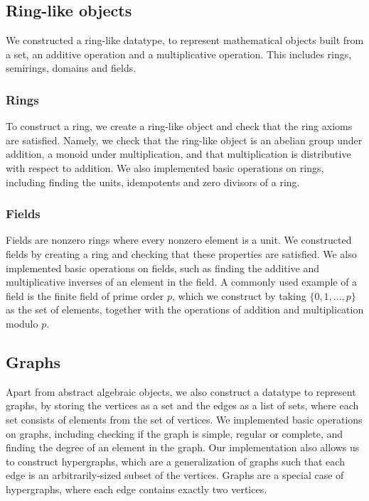\documentclass{article}
\begin{document}
        \subsection{Ring-like objects}
		We constructed a ring-like datatype, to represent mathematical objects built from a set, an additive operation and a multiplicative operation. This includes rings, semirings, domains and fields. 

		\subsubsection{Rings}
			To construct a ring, we create a ring-like object and check that the ring axioms are satisfied. Namely, we check that the ring-like object is an abelian group under addition, a monoid under multiplication, and that multiplication is distributive with respect to addition. We also implemented basic operations on rings, including finding the units, idempotents and zero divisors of a ring. 

		\subsubsection{Fields}
           		Fields are nonzero rings where every nonzero element is a unit. We constructed fields by creating a ring and checking that these properties are satisfied. We also implemented basic operations on fields, such as finding the additive and multiplicative inverses of an element in the field. A commonly used example of a field is the finite field of prime order $p$, which we construct by taking $\{0,1,..., p\}$ as the set of elements, together with the operations of addition and multiplication modulo $p$.
        
        
        \subsection{Graphs}
            Apart from abstract algebraic objects, we also construct a datatype to represent graphs, by storing the vertices as a set and the edges as a list of sets, where each set consists of elements from the set of vertices. We implemented basic operations on graphs, including checking if the graph is simple, regular or complete, and finding the degree of an element in the graph. Our implementation also allows us to construct hypergraphs, which are a generalization of graphs such that each edge is an arbitrarily-sized subset of the vertices. Graphs are a special case of hypergraphs, where each edge contains exactly two vertices.
    
\end{document}
